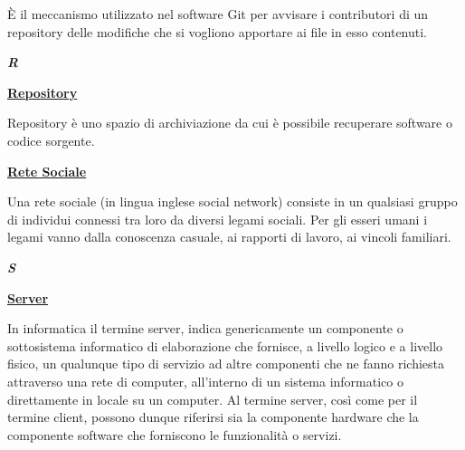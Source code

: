 \medskip
\begin{addmargin}[5em]{1em}
È il meccanismo utilizzato nel software Git per avvisare i contributori di un repository delle modifiche che si vogliono apportare ai file in esso contenuti.	
\end{addmargin}	

\newpage
	
\cleardoublepage
{}
{}
\noindent\hrulefill\hspace{4mm}\textbf{\textsl{\Huge{R}}}\hspace{4mm}\hrulefill

\vspace*{2\bigskipamount}

\bigskip
\begin{addmargin}[0em]{0em}	
	\textbf{\underline{Repository}}
\end{addmargin} 

\medskip
\begin{addmargin}[5em]{1em}
Repository è uno spazio di archiviazione da cui è possibile recuperare software o codice sorgente.
\end{addmargin}	

\bigskip
\begin{addmargin}[0em]{0em}	
	\textbf{\underline{Rete Sociale}} 
\end{addmargin}
	
\medskip
\begin{addmargin}[5em]{1em}
Una rete sociale (in lingua inglese social network) consiste in un qualsiasi gruppo di individui connessi tra loro da diversi legami sociali. Per gli esseri umani i legami vanno dalla conoscenza casuale, ai rapporti di lavoro, ai vincoli familiari.
\end{addmargin}	
	
\newpage
	
\cleardoublepage
{}
{}
\noindent\hrulefill\hspace{4mm}\textbf{\textsl{\Huge{S}}}\hspace{4mm}\hrulefill

\vspace*{2\bigskipamount}

\begin{addmargin}[0em]{0em}
	\textbf{\underline{Server}}
\end{addmargin} 
	
\medskip
\begin{addmargin}[5em]{1em}	
	In informatica il termine server, indica genericamente un componente o sottosistema informatico di elaborazione che fornisce, a livello logico e a livello fisico, un qualunque tipo di servizio ad altre componenti che ne fanno richiesta attraverso una rete di computer, all'interno di un sistema informatico o direttamente in locale su un computer.
Al termine server, così come per il termine client, possono dunque riferirsi sia la componente hardware che la componente software che forniscono le funzionalità o servizi.
\end{addmargin}

